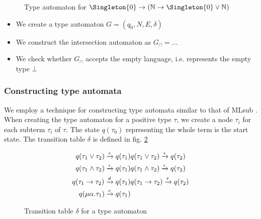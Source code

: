 \begin{figure}[ht]
  \centering
  \caption{Type automaton for $\Singleton{0} \to (\Nat \to \Singleton{0} \join \Nat)$}
  \label{fig:example-type-automaton}
\end{figure}

\begin{itemize}
  \item We create a type automaton $G = (q_0, N, E, \delta)$
  \item We construct the intersection automaton as $G_\cap = \dots$
  \item We check whether $G_\cap$ accepts the empty language, i.e. represents the empty type $\bot$
\end{itemize}

\subsubsection{Constructing type automata}

We employ a technique for constructing type automata similar to that of MLsub \cite{dolanMLsub}.
When creating the type automaton for a positive type $\tau$, we create a node $\tau_i$ for each subterm $\tau_i$ of $\tau$.
The state $q(\tau_0)$ representing the whole term is the start state.
The transition table $\delta$ is defined in fig. \ref{fig:automaton-transitions}

\begin{figure}[ht]
    \begin{align*}
        q(\tau_1  \vee \tau_2)  \xrightarrow[]{\epsilon} q(\tau_1) &
        q(\tau_1  \vee \tau_2)  \xrightarrow[]{\epsilon} q(\tau_2) \\
        q(\tau_1  \wedge \tau_2)  \xrightarrow[]{\epsilon} q(\tau_1) &
        q(\tau_1  \wedge \tau_2)  \xrightarrow[]{\epsilon} q(\tau_2) \\
        q(\tau_1  \to \tau_2)  \xrightarrow[]{d} q(\tau_1) &
        q(\tau_1  \to \tau_2)  \xrightarrow[]{r} q(\tau_2) \\
        q(\mu\alpha.\tau_1)  \xrightarrow[]{\epsilon} q(\tau_1)  &
    \end{align*}
    \caption{Transition table $\delta$ for a type automaton}
    \label{fig:automaton-transitions}
\end{figure}

